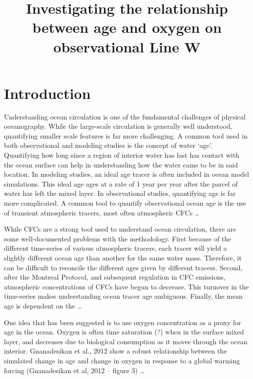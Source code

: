 \documentclass{ametsoc}
\title{Investigating the relationship between age and oxygen on observational Line W}
\affiliation{Johns Hopkins University, Department of Earth and Planetary
Sciences, Baltimore, MD, 21201}
\begin{document}
\maketitle



\section{Introduction}

Understanding ocean circulation is one of the fundamental challenges of physical oceanography. While the large-scale circulation is generally well understood, quantifying smaller scale features is far more challenging. A common tool used in both observational and modeling studies is the concept of water ‘age’. Quantifying how long since a region of interior water has last has contact with the ocean surface can help in understanding how the water came to be in said location. In modeling studies, an ideal age tracer is often included in ocean model simulations. This ideal age ages at a rate of 1 year per year after the parcel of water has left the mixed layer. In observational studies, quantifying age is far more complicated. A common tool to quantify observational ocean age is the use of transient atmospheric tracers, most often atmospheric CFCs \dots

While CFCs are a strong tool used to understand ocean circulation, there are some well-documented problems with the methodology. First because of the different time-series of various atmospheric tracers, each tracer will yield a slightly different ocean age than another for the same water mass. Therefore, it can be difficult to reconcile the different ages given by different tracers. Second, after the Montreal Protocol, and subsequent regulation in CFC emissions, atmospheric concentrations of CFCs have begun to decrease. This turnover in the time-series makes understanding ocean tracer age ambiguous. Finally, the mean age is dependent on the \ldots

One idea that has been suggested is to use oxygen concentration as a proxy for age in the ocean. Oxygen is often time saturation (?) when in the surface mixed layer, and decreases due to biological consumption as it moves through the ocean interior. Gnanadesikan et al., 2012 show a robust relationship between the simulated change in age and change in oxygen in response to a global warming forcing (Gnanadesikan et al, 2012 – figure 3) \ldots
\end{document}
